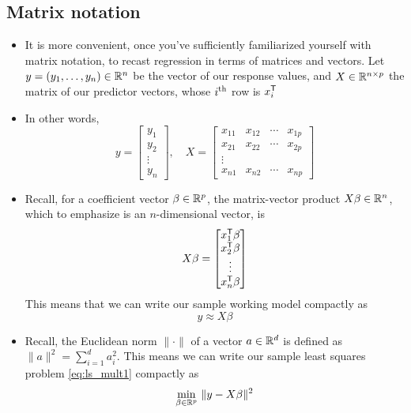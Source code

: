 \documentclass{article}
\begin{document}
\subsection{Matrix notation}

\begin{itemize}
\item It is more convenient, once you've sufficiently familiarized yourself with
  matrix notation, to recast regression in terms of matrices and vectors. Let $y 
  = (y_1, \dots, y_n) \in \mathbb{R}^n$ be the vector of our response values, and $X \in
  \mathbb{R}^{n \times p}$ the matrix of our predictor vectors, whose $i^{\textnormal{th}}$ row is
  $x_i^{\mathsf{T}}$    

\item In other words,
  \[
  y = \begin{bmatrix} 
    y_1 \\ y_2 \\ \vdots \\ y_n 
  \end{bmatrix}, \quad 
  X = \begin{bmatrix} 
    x_{11} & x_{12} & \cdots & x_{1p} \\
    x_{21} & x_{22} & \cdots & x_{2p} \\
    \vdots & & & \\
    x_{n1} & x_{n2} & \cdots & x_{np} 
    \end{bmatrix}
  \]

\item Recall, for a coefficient vector $\beta \in \mathbb{R}^p$, the matrix-vector
  product $X \beta \in \mathbb{R}^n$, which to emphasize is an $n$-dimensional vector,
  is    
  \[
  X \beta = 
  \begin{bmatrix} 
    x_1^{\mathsf{T}} \beta \\ x_2^{\mathsf{T}} \beta \\ \vdots \\ x_n^{\mathsf{T}} \beta 
  \end{bmatrix}
  \]
  This means that we can write our sample working model compactly as
  \[
  y \approx X \beta
  \]

\item Recall, the Euclidean norm $\|\cdot\|$ of a vector $a \in \mathbb{R}^d$ is defined
  as $\|a\|^2 = \sum_{i=1}^d a_i^2$. This means we can write our sample least
  squares problem \eqref{eq:ls_mult1} compactly as 
  \begin{equation}
  \label{eq:ls_mult2}
  \min_{\beta \in \mathbb{R}^p} \, \|y - X \beta\|^2
  \end{equation}


\end{itemize}
\end{document}

